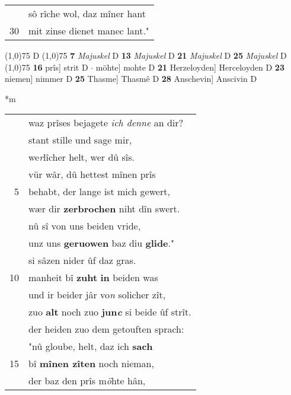 \documentclass[8pt,a4paper,notitlepage]{article}
\begin{document}
\begin{table}[ht]
\begin{minipage}[t]{0.5\linewidth}
\begin{tabular}{rl}
 & sô rîche wol, daz mîner hant\\ 
30 & mit zinse dienet manec lant."\\ 
\end{tabular}
\scriptsize
\line(1,0){75} \newline
D \newline
\line(1,0){75} \newline
\textbf{7} \textit{Majuskel} D  \textbf{13} \textit{Majuskel} D  \textbf{21} \textit{Majuskel} D  \textbf{25} \textit{Majuskel} D  \newline
\line(1,0){75} \newline
\textbf{16} prîs] strit D  $\cdot$ möhte] mohte D \textbf{21} Herzeloyden] Herceloyden D \textbf{23} niemen] nimmer D \textbf{25} Thasme] Thasmê D \textbf{28} Anschevin] Anscivin D \newline
\end{minipage}
\hspace{0.5cm}
\begin{minipage}[t]{0.5\linewidth}
\small
\begin{center}*m
\end{center}
\begin{tabular}{rl}
 & waz prîses bejagete \textit{ich denne} an dir?\\ 
 & stant stille und sage mir,\\ 
 & we\textit{r}lîcher helt, wer dû sîs.\\ 
 & vür wâr, dû hettest mînen prîs\\ 
5 & behabt, der lange ist mich gewert,\\ 
 & wær dir \textbf{zerbrochen} niht dîn swert.\\ 
 & nû sî von uns beiden vride,\\ 
 & unz uns \textbf{geruowen} baz diu \textbf{glide}."\\ 
 & si sâzen nider ûf daz gras.\\ 
10 & manheit bî \textbf{zuht} \textbf{in} beiden was\\ 
 & und ir beider jâr vo\textit{n} solicher zît,\\ 
 & zuo \textbf{alt} noch zuo \textbf{jun\textit{c}} si beide ûf strît.\\ 
 & der heiden zuo dem getouften sprach:\\ 
 & "nû gloube, helt, daz ich \textbf{sach}\\ 
15 & bî \textbf{mînen zîten} noch nieman,\\ 
 & der baz den prîs m\textit{ö}hte hân,\\ 

\end{tabular}
\end{minipage}
\end{table}
\end{document}

